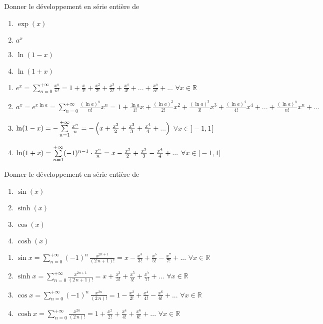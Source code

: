 \documentclass[12pt]{article}
\newcommand*{\xfield}[1]{\begin{mdframed}\centering #1\end{mdframed}\bigskip}
\newenvironment{note}{}{}
\begin{document}
\begin{note}
	\xfield{Donner le développement en série entière de
	\begin{enumerate}
		\item $\exp(x)$
		\item $a^x$
		\item $\ln(1-x)$
		\item $\ln(1+x)$
	\end{enumerate}}
	\xfield{\begin{enumerate}
		\item $e^x=\sum\limits_{n=0}^{+{\infty}}{\frac{x^n}{n!}} = 1 + \frac{x}{1!} + \frac{x^2}{2!} + \frac{x^3}{3!} + \frac{x^4}{4!} + ... + \frac{x^n}{n!} + ...$ $\forall x \in \mathbb{R}$
		\item $a^x= e^{x \ln a} =\sum\limits_{n=0}^{+{\infty}}{\frac{(\ln a)^n}{n!}}x^n = 1 + \frac{\ln a}{1!}x + \frac{(\ln a )^2}{2!}x^2 + \frac{(\ln a )^3}{3!}x^3 + \frac{(\ln a )^4}{4!}x^4 + ... + \frac{(\ln a )^n}{n!}x^n + ...$
		\item $\ln (1-x)=-\sum\limits_{n=1}^{+{\infty}}{x^{n}\over{n}} = - \left( x + \frac{x^2}{2} + \frac{x^3}{3} + \frac{x^4}{4} + ...\right)$ $\forall x \in ]-1,1[$
		\item $\ln (1+x)=\sum\limits_{n=1}^{+{\infty}}(-1)^{n-1} \cdot {x^{n}\over{n}} = x - \frac{x^2}{2} + \frac{x^3}{3} - \frac{x^4}{4} + ...$  $\forall x \in ]-1,1[$
	\end{enumerate}}
\end{note}

\begin{note}
	\xfield{Donner le développement en série entière de
	\begin{enumerate}
	\item $\sin(x)$
	\item $\sinh(x)$
	\item $\cos(x)$
	\item $\cosh(x)$
	\end{enumerate} }
	\xfield{\begin{enumerate}
		\item $ \sin x=\sum\limits_{n=0}^{+{\infty}}(-1)^n\,{\frac{x^{2n+1}}{(2\,n+1)!}} = x - \frac{x^3}{3!} + \frac{x^5}{5!} - \frac{x^7}{7!} + ...$ $\forall x \in \mathbb{R}$
		\item $\sinh x = \sum\limits_{n=0}^{+{\infty}}{\frac{x^{2n+1}}{(2\,n+1)!}} = x + \frac{x^3}{3!} +  \frac{x^5}{5!} +  \frac{x^7}{7!} + ...$ $\forall x \in \mathbb{R}$
		\item $\cos x=\sum\limits_{n=0}^{+{\infty}}(-1)^n\,{\frac{x^{2n}}{(2\,n)!}} = 1 - \frac{x^2}{2!} +\frac{x^4}{4!} -\frac{x^6}{6!} +...$ $\forall x \in \mathbb{R}$
		\item $\cosh x = \sum\limits_{n=0}^{+{\infty}}{\frac{x^{2n}}{(2\,n)!}} = 1 +  \frac{x^2}{2!} +  \frac{x^4}{4!} + \frac{x^6}{6!} + ...$ $\forall x \in \mathbb{R}$
	\end{enumerate} }
\end{note}
\end{document}
